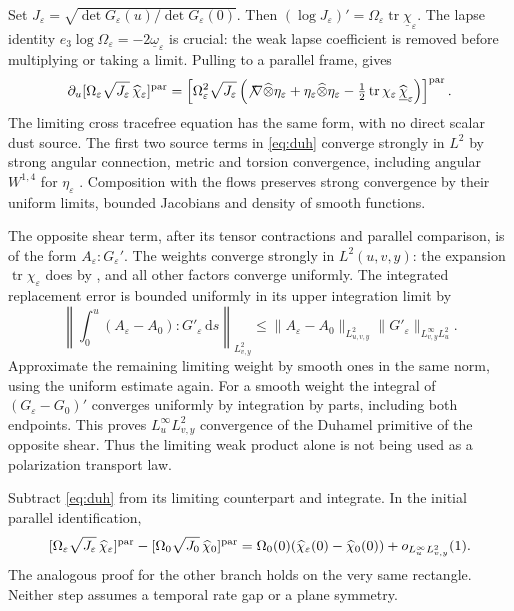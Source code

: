 \documentclass[11pt]{article}
\newcommand{\eps}{\varepsilon}
\newcommand{\Tr}{\operatorname{tr}}
\newcommand{\dd}{\mathrm d}
\begin{document}
Set $J_\eps=\sqrt{\det G_\eps(u)/\det G_\eps(0)}$. Then $(\log J_\eps)'=\Omega_\eps\Tr\underline\chi_\eps$. The lapse identity $e_3\log\Omega_\eps=-2\underline\omega_\eps$ is crucial: the weak lapse coefficient is removed before multiplying or taking a limit. Pulling to a parallel frame, \cite[(2.20)]{LR} gives
\begin{equation}\label{eq:duh}
 \partial_u[\Omega_\eps\sqrt{J_\eps}\,\widehat\chi_\eps]^{\rm par}
 =\left[\Omega_\eps^2\sqrt{J_\eps}
 \left(\not\nabla\widehat\otimes\eta_\eps+
       \eta_\eps\widehat\otimes\eta_\eps-
       \tfrac12\Tr\chi_\eps\,\widehat{\underline\chi}_\eps\right)\right]^{\rm par}.
\end{equation}
The limiting cross tracefree equation has the same form, with no direct scalar dust source. The first two source terms in \eqref{eq:duh} converge strongly in $L^2$ by strong angular connection, metric and torsion convergence, including angular $W^{1,4}$ for $\eta_\eps$ \cite[Props.~6.4, 6.8, 6.10]{LR}. Composition with the flows preserves strong convergence by their uniform limits, bounded Jacobians and density of smooth functions.

The opposite shear term, after its tensor contractions and parallel comparison, is of the form $A_\eps:G_\eps'$. The weights converge strongly in $L^2(u,v,y)$: the expansion $\Tr\chi_\eps$ does by \cite[Prop.~6.15]{LR}, and all other factors converge uniformly. The integrated replacement error is bounded uniformly in its upper integration limit by
\[
 \left\|\int_0^u (A_\eps-A_0):G'_\eps\,\dd s\right\|_{L^2_{v,y}}
 \leq \|A_\eps-A_0\|_{L^2_{u,v,y}}
          \|G'_\eps\|_{L^\infty_{v,y}L^2_u}.
\]
Approximate the remaining limiting weight by smooth ones in the same norm, using the uniform estimate again. For a smooth weight the integral of $(G_\eps-G_0)'$ converges uniformly by integration by parts, including both endpoints. This proves $L^\infty_u L^2_{v,y}$ convergence of the Duhamel primitive of the opposite shear. Thus the limiting weak product alone is not being used as a polarization transport law.

Subtract \eqref{eq:duh} from its limiting counterpart and integrate. In the initial parallel identification,
\[
 [\Omega_\eps\sqrt{J_\eps}\,\widehat\chi_\eps]^{\rm par}
 -[\Omega_0\sqrt{J_0}\,\widehat\chi_0]^{\rm par}
 =\Omega_0(0)(\widehat\chi_\eps(0)-\widehat\chi_0(0))
    +o_{L^\infty_uL^2_{v,y}}(1).
\]
The analogous proof for the other branch holds on the very same rectangle. Neither step assumes a temporal rate gap or a plane symmetry.
\end{document}
